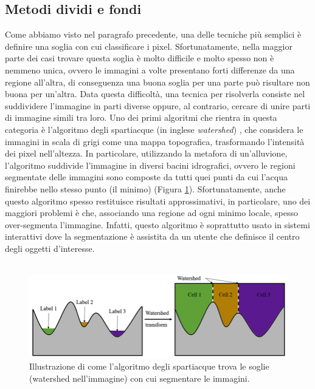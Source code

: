 \subsection{Metodi dividi e fondi}
\label{metodi_dividi_fondi}
Come abbiamo visto nel paragrafo precedente, una delle tecniche più semplici è definire una soglia con cui classificare i pixel. Sfortunatamente, nella maggior parte dei casi trovare questa soglia è molto difficile e molto spesso non è nemmeno unica, ovvero le immagini a volte presentano forti differenze da una regione all'altra, di conseguenza una buona soglia per una parte può risultare non buona per un'altra. 
Data questa difficoltà, una tecnica per risolverla consiste nel suddividere l'immagine in parti diverse oppure, al contrario, cercare di unire parti di immagine simili tra loro.
Uno dei primi algoritmi che rientra in questa categoria è l'algoritmo degli spartiacque (in inglese \textit{watershed}) \cite{watershed}, che considera le immagini in scala di grigi come una mappa topografica, trasformando l'intensità dei pixel nell'altezza. In particolare, utilizzando la metafora di un'alluvione, l'algoritmo suddivide l'immagine in diversi bacini idrografici, ovvero le regioni segmentate delle immagini sono composte da tutti quei punti da cui l'acqua finirebbe nello stesso punto (il minimo) (Figura \ref{fig:watershed}). Sfortunatamente, anche questo algoritmo spesso restituisce risultati approssimativi, in particolare, uno dei maggiori problemi è che, associando una regione ad ogni minimo locale, spesso over-segmenta l'immagine. Infatti, questo algoritmo è soprattutto usato in sistemi interattivi dove la segmentazione è assistita da un utente che definisce il centro degli oggetti d'interesse.
\\ \\
\begin{figure}[h!]
    \centering
    \hspace*{-0.1in}
    \includegraphics[scale=0.4]{img/watershed2.jpg}
    \caption{Illustrazione di come l'algoritmo degli spartiacque trova le soglie (watershed nell'immagine) con cui segmentare le immagini.}
    \label{fig:watershed}
\end{figure}

